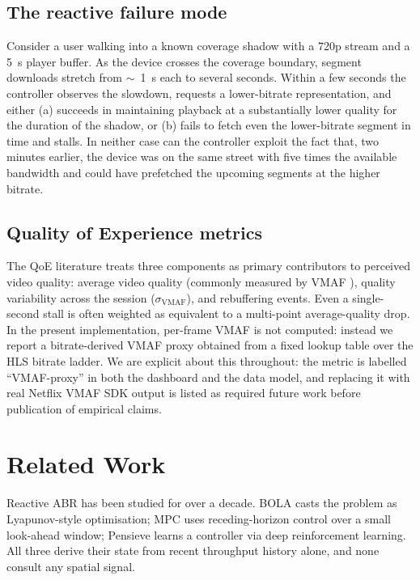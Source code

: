 \documentclass[conference]{IEEEtran}
\begin{document}
\subsection{The reactive failure mode}
Consider a user walking into a known coverage shadow with a 720p stream and
a 5~s player buffer. As the device crosses the coverage boundary, segment
downloads stretch from $\sim$~1~s each to several seconds. Within a few
seconds the controller observes the slowdown, requests a lower-bitrate
representation, and either (a) succeeds in maintaining playback at a
substantially lower quality for the duration of the shadow, or (b) fails
to fetch even the lower-bitrate segment in time and stalls. In neither
case can the controller exploit the fact that, two minutes earlier, the
device was on the same street with five times the available bandwidth and
could have prefetched the upcoming segments at the higher bitrate.

\subsection{Quality of Experience metrics}
The QoE literature treats three components as primary contributors to
perceived video quality: average video quality (commonly measured by VMAF
\cite{vmaf}), quality variability across the session ($\sigma_{\text{VMAF}}$), and
rebuffering events. Even a single-second stall is often weighted as
equivalent to a multi-point average-quality drop. In the present
implementation, per-frame VMAF is not computed: instead we report a
bitrate-derived VMAF proxy obtained from a fixed lookup table over the
HLS bitrate ladder. We are explicit about this throughout: the metric is
labelled ``VMAF-proxy'' in both the dashboard and the data model, and
replacing it with real Netflix VMAF SDK output is listed as required
future work before publication of empirical claims.

\section{Related Work}
Reactive ABR has been studied for over a decade. BOLA \cite{bola} casts the
problem as Lyapunov-style optimisation; MPC \cite{mpc} uses receding-horizon
control over a small look-ahead window; Pensieve \cite{pensieve} learns a
controller via deep reinforcement learning. All three derive their state
from recent throughput history alone, and none consult any spatial signal.
\end{document}
